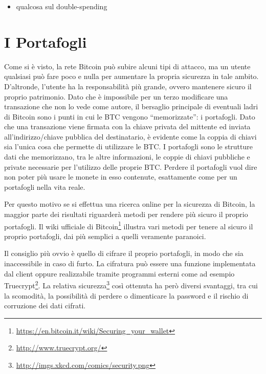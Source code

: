 \begin{itemize}
\item
  qualcosa sul double-spending

\end{itemize}

\section{I Portafogli}\label{i-portafogli}

Come si è visto, la rete Bitcoin può subire alcuni tipi di attacco, ma un utente qualsiasi può fare poco e nulla per aumentare la propria sicurezza in tale ambito.
D'altronde, l'utente ha la responsabilità più grande, ovvero mantenere sicuro il proprio patrimonio. Dato che è impossibile per un terzo modificare una transazione che non lo vede come autore, il bersaglio principale di eventuali ladri di Bitcoin sono i punti in cui le BTC vengono ``memorizzate'': i portafogli.
Dato che una transazione viene firmata con la chiave privata del mittente ed inviata all'indirizzo/chiave pubblica del destinatario, è evidente come la coppia di chiavi sia l'unica cosa che permette di utilizzare le BTC.
I portafogli sono le strutture dati che memorizzano, tra le altre informazioni, le coppie di chiavi pubbliche e private necessarie per l'utilizzo delle proprie BTC. Perdere il portafogli vuol dire non poter più usare le monete in esso contenute, esattamente come per un portafogli nella vita reale.

Per questo motivo se si effettua una ricerca online per la sicurezza di Bitcoin, la maggior parte dei risultati riguarderà metodi per rendere più sicuro il proprio portafogli.
Il wiki ufficiale di Bitcoin\footnote{\url{https://en.bitcoin.it/wiki/Securing_your_wallet}} illustra vari metodi per tenere al sicuro il proprio portafogli, dai più semplici a quelli veramente paranoici.

Il consiglio più ovvio è quello di cifrare il proprio portafogli, in modo che sia inaccessibile in caso di furto. La cifratura può essere una funzione implementata dal client oppure realizzabile tramite programmi esterni come ad esempio Truecrypt\footnote{\url{http://www.truecrypt.org/}}. La relativa sicurezza\footnote{\url{http://imgs.xkcd.com/comics/security.png}} così ottenuta ha però diversi svantaggi, tra cui la scomodità, la possibilità di perdere o dimenticare la password e il rischio di corruzione dei dati cifrati.

